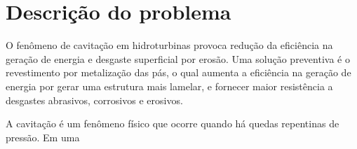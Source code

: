 \section{Descrição do problema}\label{sec:consideracoes}
O fenômeno de cavitação em hidroturbinas provoca redução da eficiência na
geração de energia e desgaste superficial por erosão. Uma solução preventiva é
o revestimento por metalização das pás, o qual aumenta a eficiência na
geração de energia por gerar uma estrutura mais lamelar, e fornecer maior
resistência a desgastes abrasivos, corrosivos e erosivos.

A cavitação é um fenômeno físico que ocorre quando há quedas repentinas de
pressão. Em uma

